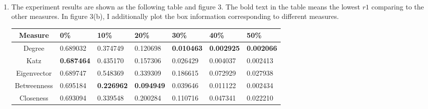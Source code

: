 \documentclass[12pt]{article}
\newcommand {\bsolution}{\noindent {\em Solution:} \ }
\begin{document}
\bsolution
\begin{enumerate}[label=(\alph*)]
	\item The experiment results are shown as the following table and figure 3. The bold text in the table means the lowest $r1$ comparing to the other measures. In figure 3(b), I additionally plot the box information corresponding to different measures. \\[1em]
		\begin{tabular}{|c|l|l|l|l|l|l|}
			\hline
			Measure     & 0\% & 10\% & 20\% & 30\% & 40\% & 50\% \\ \hline
			Degree      & 0.689032 & 0.374749 & 0.120698 & \textbf{0.010463} & \textbf{0.002925} & \textbf{0.002066} \\ \hline
			Katz        & \textbf{0.687464} & 0.435170 & 0.157306 & 0.026429 & 0.004037 & 0.002413 \\ \hline
			Eigenvector & 0.689747 & 0.548369 & 0.339309 & 0.186615 & 0.072929 & 0.027938 \\ \hline
			Betweenness & 0.695184 & \textbf{0.226962} & \textbf{0.094949} & 0.039646 & 0.011122 & 0.002434 \\ \hline
			Closeness   & 0.693094 & 0.339548 & 0.200284 & 0.110716 & 0.047341 & 0.022210 \\ \hline
		\end{tabular} \\	
		\begin{figure}[htbp]
			\centering
			\quad
\end{figure}
\end{enumerate}
\end{document}
